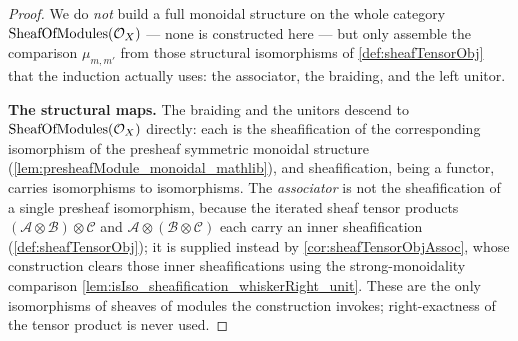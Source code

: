 \begin{proof}
    \leanok
  We do \emph{not} build a full monoidal structure on the whole category
  \(\mathrm{SheafOfModules}(\mathcal{O}_X)\) --- none is constructed here --- but only assemble
  the comparison \(\mu_{m,m'}\) from those structural isomorphisms of
  \cref{def:sheafTensorObj} that the induction actually uses: the associator,
  the braiding, and the left unitor.

  \textbf{The structural maps.} The braiding and the unitors descend to
  \(\mathrm{SheafOfModules}(\mathcal{O}_X)\) directly: each is the sheafification of the
  corresponding isomorphism of the presheaf symmetric monoidal structure
  (\cref{lem:presheafModule_monoidal_mathlib}), and sheafification, being a
  functor, carries isomorphisms to isomorphisms. The \emph{associator} is not
  the sheafification of a single presheaf isomorphism, because the iterated
  sheaf tensor products
  \((\mathcal{A} \otimes \mathcal{B}) \otimes \mathcal{C}\) and
  \(\mathcal{A} \otimes (\mathcal{B} \otimes \mathcal{C})\) each carry an inner
  sheafification (\cref{def:sheafTensorObj}); it is supplied instead by
  \cref{cor:sheafTensorObjAssoc}, whose construction clears those inner
  sheafifications using the strong-monoidality comparison
  \cref{lem:isIso_sheafification_whiskerRight_unit}. These are the only
  isomorphisms of sheaves of modules the construction invokes; right-exactness
  of the tensor product is never used.


\end{proof}
